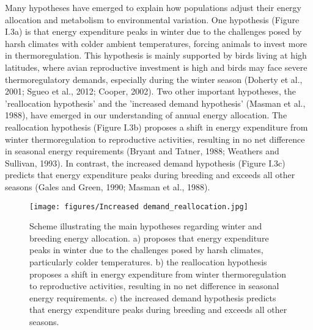 \documentclass[10pt, twoside]{book} %
\begin{document}
Many hypotheses have emerged to explain how populations adjust their energy allocation and metabolism to environmental variation. One hypothesis (Figure I.3a) is that energy expenditure peaks in winter due to the challenges posed by harsh climates with colder ambient temperatures, forcing animals to invest more in thermoregulation. This hypothesis is mainly supported by birds living at high latitudes, where avian reproductive investment is high and birds may face severe thermoregulatory demands, especially during the winter season (Doherty et al., 2001; Sgueo et al., 2012; Cooper, 2002). Two other important hypotheses, the 'reallocation hypothesis' and the 'increased demand hypothesis' (Masman et al., 1988), have emerged in our understanding of annual energy allocation. The reallocation hypothesis (Figure I.3b) proposes a shift in energy expenditure from winter thermoregulation to reproductive activities, resulting in no net difference in seasonal energy requirements (Bryant and Tatner, 1988; Weathers and Sullivan, 1993). In contrast, the increased demand hypothesis (Figure I.3c) predicts that energy expenditure peaks during breeding and exceeds all other seasons (Gales and Green, 1990; Masman et al., 1988).\\

\renewcommand{\thefigure}{I.\arabic{figure}}
	\begin{figure}[h!]
		\begin{center}
			\texttt{[image: figures/Increased demand\_reallocation.jpg]}
		\end{center}
		\begin{footnotesize}
			\caption{Scheme illustrating the main hypotheses regarding winter and breeding energy allocation. a) proposes that energy expenditure peaks in winter due to the challenges posed by harsh climates, particularly colder temperatures. b) the reallocation hypothesis proposes a shift in energy expenditure from winter thermoregulation to reproductive activities, resulting in no net difference in seasonal energy requirements. c) the increased demand hypothesis predicts that energy expenditure peaks during breeding and exceeds all other seasons. \label{figI.3}}
		\end{footnotesize}
	\end{figure}
\end{document}
